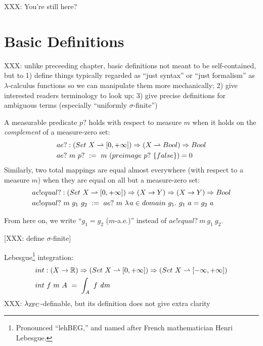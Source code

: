 
XXX: You're still here?

\section{Basic Definitions}

XXX: unlike preceeding chapter, basic definitions not meant to be self-contained, but to 1) define things typically regarded as ``just syntax'' or ``just formalism'' as $\lambda$-calculus functions so we can manipulate them more mechanically; 2) give interested readers terminology to look up; 3) give precise definitions for ambiguous terms (especially ``uniformly $\sigma$-finite'')

\begin{definition}
\label{def:almost-everywhere-equality}
A measurable predicate $p?$ holds  with respect to measure $m$ when it holds on the \emph{complement} of a measure-zero set:
\begin{equation}
\begin{aligned}
	&ae? : (Set~X \rightharpoonup [0,+\infty]) \Rightarrow (X \rightharpoonup Bool) \Rightarrow Bool \\
	&ae?~m~p?\ :=\ m~(preimage~p?~\{{false}\}) = 0
\end{aligned}
\end{equation}
Similarly, two total mappings are equal almost everywhere (with respect to a measure $m$) when they are equal on all but a measure-zero set:
\begin{equation}
\begin{aligned}
	&ae!equal? : (Set~X \rightharpoonup [0,+\infty]) \Rightarrow (X \to Y) \Rightarrow (X \to Y) \Rightarrow Bool \\
	&ae!equal?~m~g_1~g_2\ :=\ ae?~m~\lambda\mspace{2mu}{a \in domain~g_1}\ldotp\, g_1~a = g_2~a
\end{aligned}
\end{equation}
\end{definition}

From here on, we write ``$g_1 = g_2$ ($m$-a.e.)'' instead of $ae!equal?~m~g_1~g_2$.

[XXX: define $\sigma$-finite]

Lebesgue\footnote{Pronounced ``lehBEG,'' and named after French mathematician Henri Lebesgue.} integration:
\begin{equation}
\begin{aligned}
	&int : (X \to \mathbb{R}) \Rightarrow (Set~X \rightharpoonup [0,+\infty]) \Rightarrow (Set~X \rightharpoonup [-\infty,+\infty]) \\
	&int~f~m~A\ =\ \int_A~f~\mathit{d}m
\end{aligned}
\label{eqn:int-type}
\end{equation}
XXX: $\lambda_{\text{ZFC}}$-definable, but its definition does not give extra clarity

